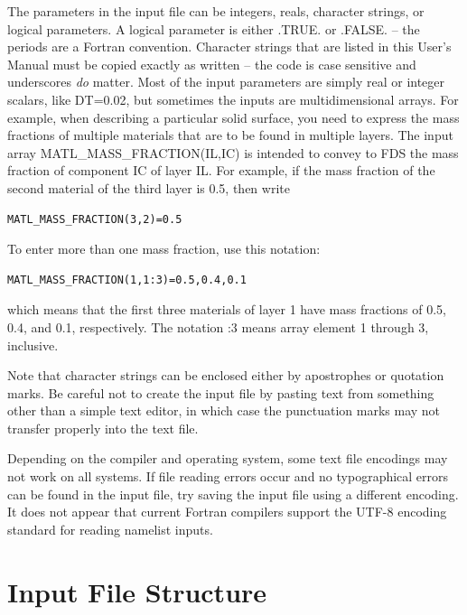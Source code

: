 \documentclass[11pt]{book}
\begin{document}
The parameters in the input file can be integers, reals, character strings, or logical parameters. A logical parameter is either {\ct .TRUE.} or {\ct .FALSE.} -- the periods are a Fortran convention. Character strings that are listed in this User's Manual must be copied exactly as written -- the code is case sensitive and underscores {\em do} matter. Most of the input parameters are simply real or integer scalars, like {\ct DT=0.02}, but sometimes the inputs are
multidimensional arrays. For example, when describing a particular solid surface, you need to express the mass fractions of multiple materials that are to be found in multiple layers. The input array {\ct MATL\_MASS\_FRACTION(IL,IC)} is intended to convey to FDS the mass fraction of component {\ct IC} of layer {\ct IL}. For example, if the mass fraction of the second material of the third layer is 0.5, then write
\begin{lstlisting}
MATL_MASS_FRACTION(3,2)=0.5
\end{lstlisting}
To enter more than one mass fraction, use this notation:
\begin{lstlisting}
MATL_MASS_FRACTION(1,1:3)=0.5,0.4,0.1
\end{lstlisting}
which means that the first three materials of layer 1 have mass fractions of 0.5, 0.4, and 0.1, respectively. The notation {:3} means array element 1 through 3, inclusive.

Note that character strings can be enclosed either by apostrophes or quotation marks.
Be careful not to create the input file by pasting text from something other than a
simple text editor, in which case the punctuation marks may not transfer
properly into the text file.

Depending on the compiler and operating system, some text file encodings may not work on all systems.
If file reading errors occur and no typographical errors can be found in the input file, try saving the input file using a different encoding.
It does not appear that current Fortran compilers support the UTF-8 encoding standard for reading namelist inputs.



\section{Input File Structure}
\end{document}
